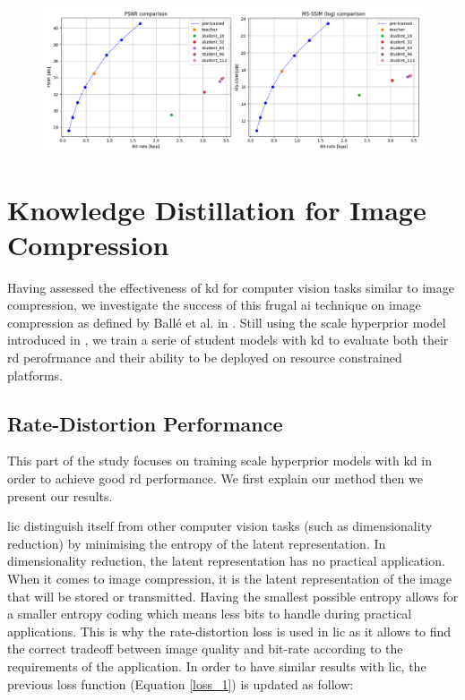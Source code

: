 \begin{figure}
    \centering
    \includegraphics[width=15cm]{img/kd_ae_3.png}
    \caption[]{}
    \label{kd_ae_2}
\end{figure}

\section{Knowledge Distillation for Image Compression}
Having assessed the effectiveness of \acrshort{kd} for computer vision tasks similar to image compression, we investigate the success of this frugal \acrshort{ai} technique on image compression as defined by Ballé et al. in \cite{ballé2016endtoendoptimizationnonlineartransform}. Still using the scale hyperprior model introduced in \cite{ballé2018variationalimagecompressionscale}, we train a serie of student models with \acrshort{kd} to evaluate both their \acrshort{rd} perofrmance and their ability to be deployed on resource constrained platforms.

\subsection{Rate-Distortion Performance}
This part of the study focuses on training scale hyperprior models with \acrshort{kd} in order to achieve good \acrshort{rd} performance. We first explain our method then we present our results.

\acrshort{lic} distinguish itself from other computer vision tasks (such as dimensionality reduction) by minimising the entropy of the latent representation. In dimensionality reduction, the latent representation has no practical application. When it comes to image compression, it is the latent representation of the image that will be stored or transmitted. Having the smallest possible entropy allows for a smaller entropy coding which means less bits to handle during practical applications. This is why the rate-distortion loss is used in \acrshort{lic} as it allows to find the correct tradeoff between image quality and bit-rate according to the requirements of the application. In order to have similar results with \acrshort{lic}, the previous loss function (Equation \eqref{loss_1}) is updated as follow:

